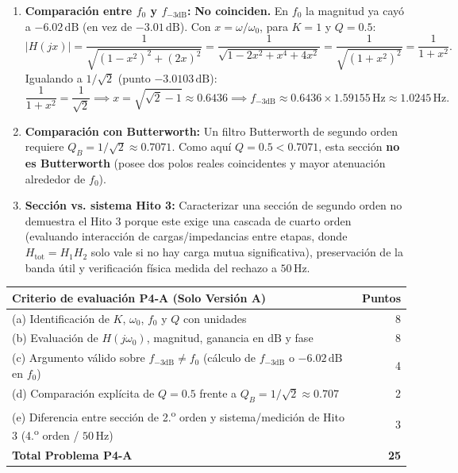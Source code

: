 \documentclass[10pt, a4paper]{article}
\begin{document}
\begin{enumerate}
    \item \textbf{Comparación entre $f_0$ y $f_{-3\mathrm{dB}}$:} \textbf{No coinciden.} En $f_0$ la magnitud ya cayó a $-6.02\,\mathrm{dB}$ (en vez de $-3.01\,\mathrm{dB}$). Con $x = \omega/\omega_0$, para $K=1$ y $Q=0.5$:
    \begin{equation}
        |H(jx)| = \frac{1}{\sqrt{(1-x^2)^2 + (2x)^2}} = \frac{1}{\sqrt{1 - 2x^2 + x^4 + 4x^2}} = \frac{1}{\sqrt{(1+x^2)^2}} = \frac{1}{1+x^2}.
    \end{equation}
    Igualando a $1/\sqrt{2}$ (punto $-3.0103\,\mathrm{dB}$):
    \begin{equation}
        \frac{1}{1+x^2} = \frac{1}{\sqrt{2}} \implies x = \sqrt{\sqrt{2}-1} \approx 0.6436 \implies f_{-3\mathrm{dB}} \approx 0.6436 \times 1.59155\,\mathrm{Hz} \approx 1.0245\,\mathrm{Hz}.
    \end{equation}
    \item \textbf{Comparación con Butterworth:} Un filtro Butterworth de segundo orden requiere $Q_B = 1/\sqrt{2} \approx 0.7071$. Como aquí $Q = 0.5 < 0.7071$, esta sección \textbf{no es Butterworth} (posee dos polos reales coincidentes y mayor atenuación alrededor de $f_0$).
    \item \textbf{Sección vs. sistema Hito 3:} Caracterizar una sección de segundo orden no demuestra el Hito 3 porque este exige una cascada de cuarto orden (evaluando interacción de cargas/impedancias entre etapas, donde $H_{\mathrm{tot}} = H_1 H_2$ solo vale si no hay carga mutua significativa), preservación de la banda útil y verificación física medida del rechazo a $50\,\mathrm{Hz}$.
\end{enumerate}

\begin{table}[htbp]
    \centering
    \footnotesize
    \begin{tabularx}{\textwidth}{@{}Xr@{}}
        \toprule
        \textbf{Criterio de evaluación P4-A (Solo Versión A)} & \textbf{Puntos} \\
        \midrule
        (a) Identificación de $K$, $\omega_0$, $f_0$ y $Q$ con unidades & 8 \\
        (b) Evaluación de $H(j\omega_0)$, magnitud, ganancia en $\mathrm{dB}$ y fase & 8 \\
        (c) Argumento válido sobre $f_{-3\mathrm{dB}} \neq f_0$ (cálculo de $f_{-3\mathrm{dB}}$ o $-6.02\,\mathrm{dB}$ en $f_0$) & 4 \\
        (d) Comparación explícita de $Q = 0.5$ frente a $Q_B = 1/\sqrt{2} \approx 0.707$ & 2 \\
        (e) Diferencia entre sección de 2.\textsuperscript{o} orden y sistema/medición de Hito 3 (4.\textsuperscript{o} orden / $50\,\mathrm{Hz}$) & 3 \\
        \midrule
        \textbf{Total Problema P4-A} & \textbf{25} \\
        \bottomrule
    \end{tabularx}
\end{table}
\end{document}
